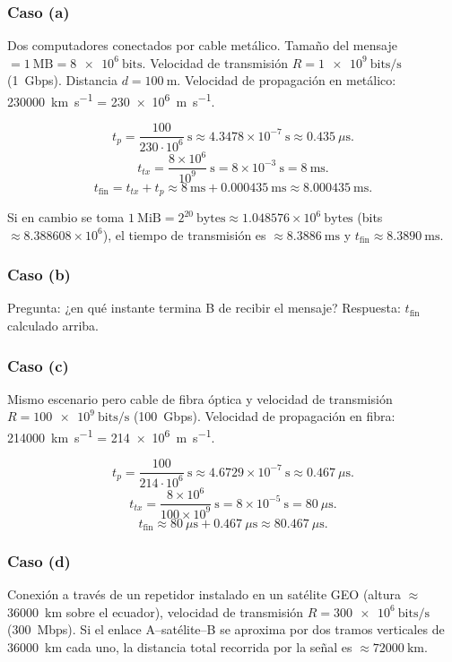 \documentclass[11pt,a4paper]{article}
\newcommand{\bits}{\mathrm{bits}}
\newcommand{\s}{\mathrm{s}}
\begin{document}
\subsubsection*{Caso (a)}
Dos computadores conectados por cable metálico. Tamaño del mensaje $=1\ \mathrm{MB} = \num{8e6}\ \bits$. Velocidad de transmisión $R=\SI{1e9}{\bits\per\s}$ (\SI{1}{Gbps}). Distancia $d=\SI{100}{\meter}$. Velocidad de propagación en metálico: \SI{230000}{\kilo\meter\per\second} = \SI{230e6}{\meter\per\second}.

\[
t_p=\frac{100}{230\cdot 10^{6}}\ \s \approx 4.3478\times 10^{-7}\ \s \approx 0.435\ \mu\text{s}.
\]
\[
t_{tx}=\frac{8\times 10^{6}}{10^{9}}\ \s = 8\times 10^{-3}\ \s = 8\ \text{ms}.
\]
\[
t_\text{fin}=t_{tx}+t_p\approx 8\ \text{ms} + 0.000435\ \text{ms}\approx 8.000435\ \text{ms}.
\]

Si en cambio se toma $1\ \text{MiB}=2^{20}\ \text{bytes}\approx 1.048576\times 10^{6}\ \text{bytes}$ (bits $\approx 8.388608\times 10^{6}$), el tiempo de transmisión es $\approx 8.3886\ \text{ms}$ y $t_\text{fin}\approx 8.3890\ \text{ms}$.

\subsubsection*{Caso (b)}
Pregunta: ¿en qué instante termina B de recibir el mensaje? Respuesta: $t_\text{fin}$ calculado arriba.

\subsubsection*{Caso (c)}
Mismo escenario pero cable de fibra óptica y velocidad de transmisión $R=\SI{100e9}{\bits\per\s}$ (\SI{100}{Gbps}). Velocidad de propagación en fibra: \SI{214000}{\kilo\meter\per\second} = \SI{214e6}{\meter\per\second}.

\[
t_p=\frac{100}{214\cdot 10^{6}}\ \s \approx 4.6729\times 10^{-7}\ \s \approx 0.467\ \mu\text{s}.
\]
\[
t_{tx}=\frac{8\times 10^{6}}{100\times 10^{9}}\ \s = 8\times 10^{-5}\ \s = 80\ \mu\text{s}.
\]
\[
t_\text{fin}\approx 80\ \mu\text{s} + 0.467\ \mu\text{s} \approx 80.467\ \mu\text{s}.
\]

\subsubsection*{Caso (d)}
Conexión a través de un repetidor instalado en un satélite GEO (altura $\approx$ \SI{36000}{\kilo\meter} sobre el ecuador), velocidad de transmisión $R=\SI{300e6}{\bits\per\s}$ (\SI{300}{Mbps}). Si el enlace A--satélite--B se aproxima por dos tramos verticales de \SI{36000}{\kilo\meter} cada uno, la distancia total recorrida por la señal es $\approx\SI{72000}{\kilo\meter}$.
\end{document}
